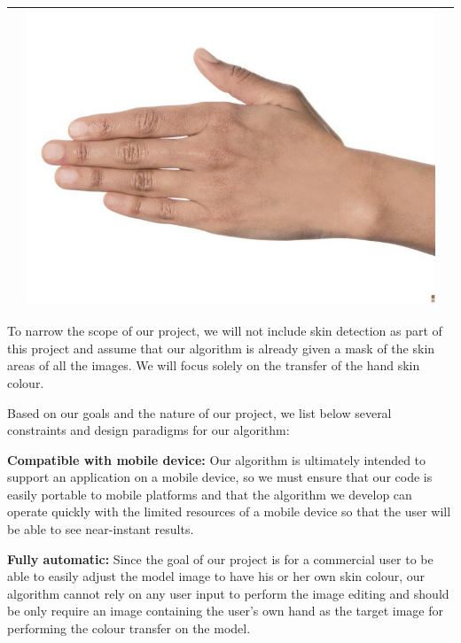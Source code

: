 \begin{table}[H]
\begin{tabular}{|c|c|c|}
\begin{minipage}{.29\textwidth}
	  \end{minipage} & 
	  \begin{minipage}{.29\textwidth}
	    \includegraphics[width=\textwidth,height=\textheight,keepaspectratio]{../rc_test/outputs/20170524_prop_corr_1p1_ave_100/hand_brown_to_hand_light.jpg}
	  \end{minipage} \\
	\hline
 \end{tabular}
 \end{table}

To narrow the scope of our project, we will not include skin detection as part of this project and assume that our algorithm is already given a mask of the skin areas of all the images. We will focus solely on the transfer of the hand skin colour. 

Based on our goals and the nature of our project, we list below several constraints and design paradigms for our algorithm:

\textbf{Compatible with mobile device:} Our algorithm is ultimately intended to support an application on a mobile device, so we must ensure that our code is easily portable to mobile platforms and that the algorithm we develop can operate quickly with the limited resources of a mobile device so that the user will be able to see near-instant results.

\textbf{Fully automatic:} Since the goal of our project is for a commercial user to be able to easily adjust the model image to have his or her own skin colour, our algorithm cannot rely on any user input to perform the image editing and should be only require an image containing the user's own hand as the target image for performing the colour transfer on the model.

